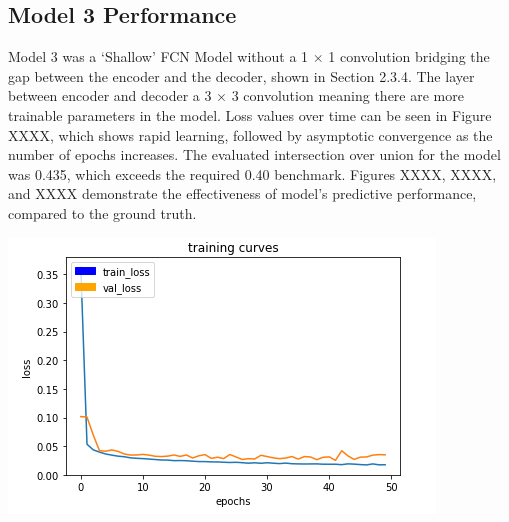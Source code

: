 \documentclass[a4paper]{article}
\begin{document}
\subsection{Model 3 Performance}
\begin{minipage}{0.45\textwidth}
Model 3 was a `Shallow' FCN Model without a 1 $\times$ 1 convolution bridging the gap between the encoder and the decoder, shown in Section 2.3.4. The layer between encoder and decoder a 3 $\times$ 3 convolution meaning there are more trainable parameters in the model. Loss values over time can be seen in Figure XXXX, which shows rapid learning, followed by asymptotic convergence as the number of epochs increases. The evaluated intersection over union for the model was 0.435, which exceeds the required 0.40 benchmark. Figures XXXX, XXXX, and XXXX demonstrate the effectiveness of model's predictive performance, compared to the ground truth.
\end{minipage}
\hspace{1cm}
\begin{minipage}{0.45\textwidth}
\centering
\includegraphics[scale=0.5]{Model_3}
\end{minipage}

\vspace{0.5cm}
\end{document}
